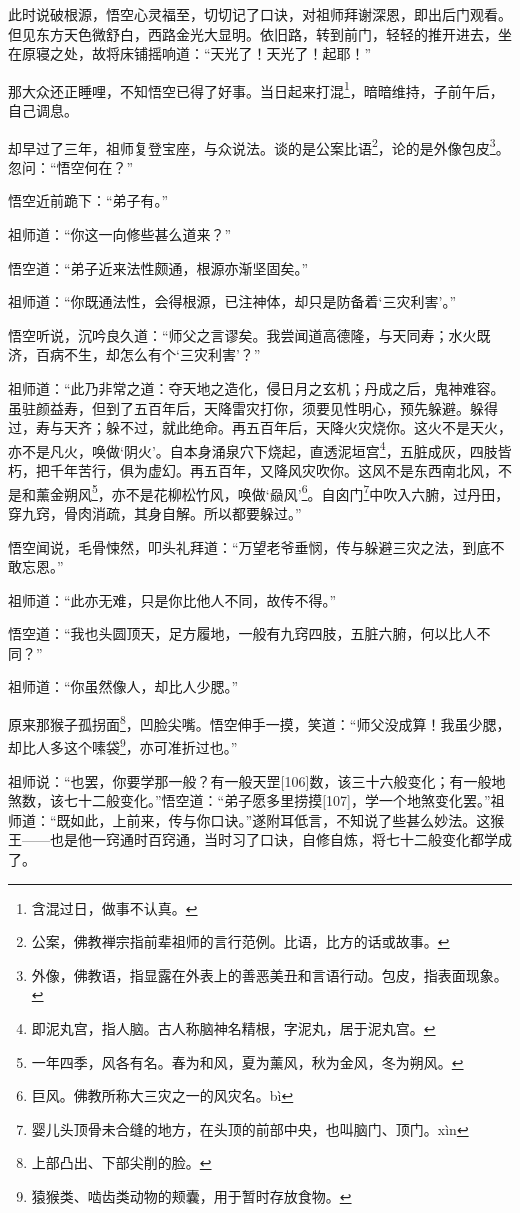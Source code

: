 \documentclass[12pt,UTF8]{ctexbook}
\begin{document}
此时说破根源，悟空心灵福至，切切记了口诀，对祖师拜谢深恩，即出后门观看。但见东方天色微舒白，西路金光大显明。依旧路，转到前门，轻轻的推开进去，坐在原寝之处，故将床铺摇响道：“天光了！天光了！起耶！”

那大众还正睡哩，不知悟空已得了好事。当日起来打混\footnote{含混过日，做事不认真。}，暗暗维持，子前午后，自己调息。

却早过了三年，祖师复登宝座，与众说法。谈的是公案比语\footnote{公案，佛教禅宗指前辈祖师的言行范例。比语，比方的话或故事。}，论的是外像包皮\footnote{外像，佛教语，指显露在外表上的善恶美丑和言语行动。包皮，指表面现象。}。忽问：“悟空何在？”

悟空近前跪下：“弟子有。”

祖师道：“你这一向修些甚么道来？”

悟空道：“弟子近来法性颇通，根源亦渐坚固矣。”

祖师道：“你既通法性，会得根源，已注神体，却只是防备着‘三灾利害’。”

悟空听说，沉吟良久道：“师父之言谬矣。我尝闻道高德隆，与天同寿；水火既济，百病不生，却怎么有个‘三灾利害’？”

祖师道：“此乃非常之道：夺天地之造化，侵日月之玄机；丹成之后，鬼神难容。虽驻颜益寿，但到了五百年后，天降雷灾打你，须要见性明心，预先躲避。躲得过，寿与天齐；躲不过，就此绝命。再五百年后，天降火灾烧你。这火不是天火，亦不是凡火，唤做‘阴火’。自本身涌泉穴下烧起，直透泥垣宫\footnote{即泥丸宫，指人脑。古人称脑神名精根，字泥丸，居于泥丸宫。}，五脏成灰，四肢皆朽，把千年苦行，俱为虚幻。再五百年，又降风灾吹你。这风不是东西南北风，不是和薰金朔风\footnote{一年四季，风各有名。春为和风，夏为薰风，秋为金风，冬为朔风。}，亦不是花柳松竹风，唤做‘赑风’\footnote{巨风。佛教所称大三灾之一的风灾名。b\`i}。自囟门\footnote{婴儿头顶骨未合缝的地方，在头顶的前部中央，也叫脑门、顶门。x\`in}中吹入六腑，过丹田，穿九窍，骨肉消疏，其身自解。所以都要躲过。”

悟空闻说，毛骨悚然，叩头礼拜道：“万望老爷垂悯，传与躲避三灾之法，到底不敢忘恩。”

祖师道：“此亦无难，只是你比他人不同，故传不得。”

悟空道：“我也头圆顶天，足方履地，一般有九窍四肢，五脏六腑，何以比人不同？”

祖师道：“你虽然像人，却比人少腮。”

原来那猴子孤拐面\footnote{上部凸出、下部尖削的脸。}，凹脸尖嘴。悟空伸手一摸，笑道：“师父没成算！我虽少腮，却比人多这个嗉袋\footnote{猿猴类、啮齿类动物的颊囊，用于暂时存放食物。}，亦可准折过也。”

祖师说：“也罢，你要学那一般？有一般天罡[106]数，该三十六般变化；有一般地煞数，该七十二般变化。”悟空道：“弟子愿多里捞摸[107]，学一个地煞变化罢。”祖师道：“既如此，上前来，传与你口诀。”遂附耳低言，不知说了些甚么妙法。这猴王——也是他一窍通时百窍通，当时习了口诀，自修自炼，将七十二般变化都学成了。
\end{document}
